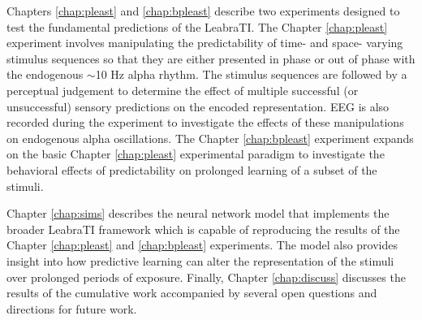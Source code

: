 \documentclass[dwyatte_dissertation.tex]{subfiles}
\begin{document}
Chapters \ref{chap:pleast} and \ref{chap:bpleast} describe two experiments designed to test the fundamental predictions of the LeabraTI. The Chapter \ref{chap:pleast} experiment involves manipulating the predictability of time- and space- varying stimulus sequences so that they are either presented in phase or out of phase with the endogenous $\sim$10 Hz alpha rhythm. The stimulus sequences are followed by a perceptual judgement to determine the effect of multiple successful (or unsuccessful) sensory predictions on the encoded representation. EEG is also recorded during the experiment to investigate the effects of these manipulations on endogenous alpha oscillations. The Chapter \ref{chap:bpleast} experiment expands on the basic Chapter \ref{chap:pleast} experimental paradigm to investigate the behavioral effects of predictability on prolonged learning of a subset of the stimuli.

Chapter \ref{chap:sims} describes the neural network model that implements the broader LeabraTI framework which is capable of reproducing the results of the Chapter \ref{chap:pleast} and \ref{chap:bpleast} experiments. The model also provides insight into how predictive learning can alter the representation of the stimuli over prolonged periods of exposure. Finally, Chapter \ref{chap:discuss} discusses the results of the cumulative work accompanied by several open questions and directions for future work.
\end{document}
